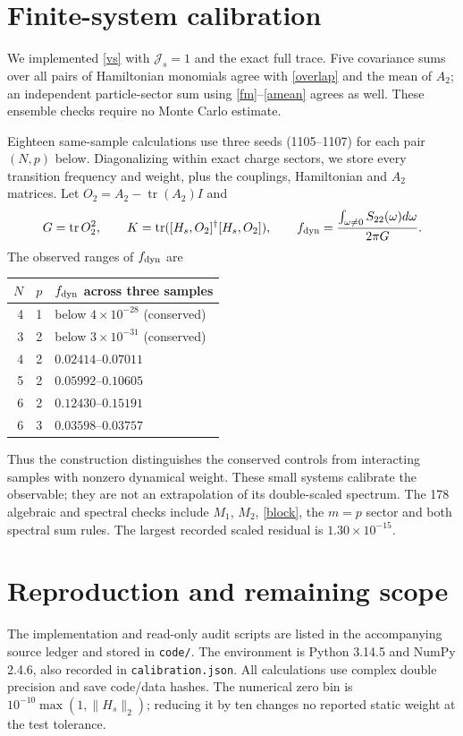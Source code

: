 \documentclass[11pt,a4paper]{article}
\newcommand{\tr}{\operatorname{tr}}
\begin{document}
\newpage
\section{Finite-system calibration}
We implemented \eqref{vs} with $\mathcal J_s=1$ and the exact full
trace. Five covariance sums over all pairs of Hamiltonian monomials
agree with \eqref{overlap} and the mean of $A_2$; an independent
particle-sector sum using \eqref{fm}--\eqref{amean} agrees as well.
These ensemble checks require no Monte Carlo estimate.

Eighteen same-sample calculations use three seeds (1105--1107) for
each pair $(N,p)$ below. Diagonalizing within exact charge sectors,
we store every transition frequency and weight, plus the couplings,
Hamiltonian and $A_2$ matrices. Let $O_2=A_2-\tr(A_2)I$ and
\begin{equation}
 G=\tr O_2^2,\qquad K=\tr([H_s,O_2]^\dagger[H_s,O_2]),\qquad
 f_{\rm dyn}=\frac{\int_{\omega\ne0}S_{22}(\omega)d\omega}{2\pi G}.
\end{equation}
The observed ranges of $f_{\rm dyn}$ are
\begin{center}
\begin{tabular}{rrl}
\toprule $N$&$p$& $f_{\rm dyn}$ across three samples\\\midrule
4&1& below $4\times10^{-28}$ (conserved)\\
3&2& below $3\times10^{-31}$ (conserved)\\
4&2& $0.02414$--$0.07011$\\
5&2& $0.05992$--$0.10605$\\
6&2& $0.12430$--$0.15191$\\
6&3& $0.03598$--$0.03757$\\\bottomrule
\end{tabular}
\end{center}
Thus the construction distinguishes the conserved controls from
interacting samples with nonzero dynamical weight. These small systems
calibrate the observable; they are not an extrapolation of its
double-scaled spectrum. The 178 algebraic and spectral checks include
$M_1$, $M_2$, \eqref{block}, the $m=p$ sector and both spectral sum rules.
The largest recorded scaled residual is $1.30\times10^{-15}$.

\appendix
\section{Reproduction and remaining scope}
The implementation and read-only audit scripts are listed in the
accompanying source ledger and stored in \texttt{code/}.
The environment is Python 3.14.5 and NumPy 2.4.6, also recorded
in \texttt{calibration.json}.
All calculations use complex double precision and save code/data hashes.
The numerical zero bin is $10^{-10}\max(1,\|H_s\|_2)$; reducing it by
ten changes no reported static weight at the test tolerance.
\end{document}
